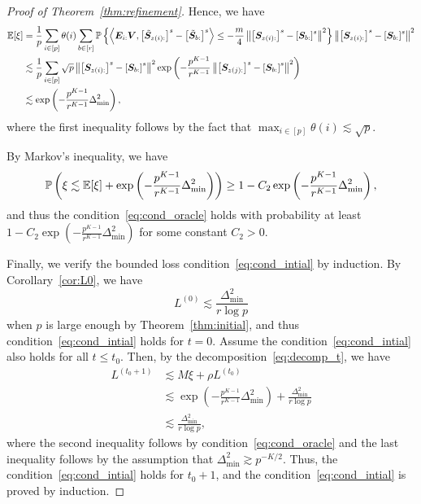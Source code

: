 \documentclass[lettersize,journal]{IEEEtran}
\theoremstyle{definition}
\theoremstyle{definition}
\newcommand{\of}[1]{\left(#1\right)}
\newcommand{\off}[1]{\left[#1\right]}
\newcommand{\offf}[1]{\left\{#1\right\}}
\newcommand{\ang}[1]{\left\langle#1\right\rangle}
\begin{document}
\begin{proof}[Proof of Theorem~\ref{thm:refinement}]
    Hence, we have 
    \begin{align}
        \bbE[\xi] & =  \frac{1}{p} \sum_{i \in [p]} \theta(i) \sum_{b \in [r]} \bbP \offf{  \ang{ \mE_{i:} \mV, \off{  \tilde \mS_{z(i):} }^s - \off{  \tilde \mS_{b:} }^s }  \leq - \frac{ m}{4} \onorm{ \off{ \mS_{z(i):}  }^s - \off{ \mS_{b:}  }^s  }^2 } \onorm{ \off{ \mS_{z(i):}  }^s - \off{ \mS_{ b:}  }^s  }^2 \\
        &\lesssim \frac{1}{p} \sum_{i \in [p]}  \sqrt{p} \onorm{ \off{ \mS_{z(i):}  }^s - \off{ \mS_{b:}  }^s  }^2   \exp \of{  - \frac{p^{K-1}}{r^{K-1}}   \onorm{ \off{ \mS_{z(j):}  }^s - \off{ \mS_{b:}  }^s  }^2 } \\
        & \lesssim  \exp \of{  - \frac{p^{K-1}}{r^{K-1}}   \Delta_{\min}^2 },
    \end{align}
    where the first inequality follows by the fact that $\max_{i \in [p]} \theta(i) \lesssim \sqrt{p}$.
    
    By Markov's inequality, we have 
    \begin{equation}
        \bbP\of{ \xi \lesssim \bbE[\xi] + \exp \of{  - \frac{p^{K-1}}{r^{K-1}}   \Delta_{\min}^2 } } \geq 1 -  C_2 \exp \of{  - \frac{p^{K-1}}{r^{K-1}}   \Delta_{\min}^2 },
    \end{equation}
    and thus the condition~\eqref{eq:cond_oracle} holds with probability at least $1 -  C_2 \exp \of{  - \frac{p^{K-1}}{r^{K-1}}   \Delta_{\min}^2 }$ for some constant $C_2 > 0$.
    
    Finally, we verify the bounded loss condition~\eqref{eq:cond_intial} by induction. By Corollary~\ref{cor:L0}, we have 
    \begin{equation}
        L^{(0)} \lesssim \frac{\Delta_{\min}^2}{r \log p}
    \end{equation}
    when $p$ is large enough by Theorem~\ref{thm:initial}, and thus condition~\eqref{eq:cond_intial} holds for $t = 0$. Assume the condition~\eqref{eq:cond_intial} also holds for all $t \leq t_0$. Then, by the decomposition~\eqref{eq:decomp_t}, we have 
    \begin{align}
         L^{(t_0+1)} &\lesssim M \xi + \rho L^{(t_0)} \\
         & \lesssim  \exp \of{  - \frac{p^{K-1}}{r^{K-1}}   \Delta_{\min}^2 } + \frac{\Delta_{\min}^2}{r \log p} \\
         & \lesssim \frac{\Delta_{\min}^2}{r\log p} ,
    \end{align}
    where the second inequality follows by condition~\eqref{eq:cond_oracle} and the last inequality follows by the assumption that $\Delta_{\min}^2 \gtrsim p^{-K/2}$. Thus, the condition~\eqref{eq:cond_intial} holds for $t_0 + 1$, and the condition~\eqref{eq:cond_intial} is proved by induction.
\end{proof}
\end{document}
